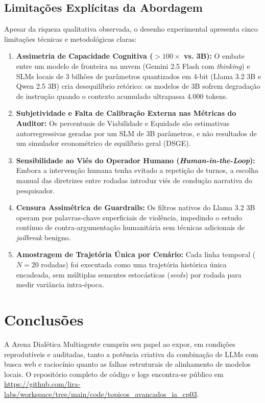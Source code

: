 \documentclass[runningheads]{llncs}
\begin{document}
\subsection{Limitações Explícitas da Abordagem}
Apesar da riqueza qualitativa observada, o desenho experimental apresenta cinco limitações técnicas e metodológicas claras:
\begin{enumerate}
    \item \textbf{Assimetria de Capacidade Cognitiva ($>100\times$ vs. 3B):} O embate entre um modelo de fronteira na nuvem (Gemini 2.5 Flash com \textit{thinking}) e SLMs locais de 3 bilhões de parâmetros quantizados em 4-bit (Llama 3.2 3B e Qwen 2.5 3B) cria desequilíbrio retórico: os modelos de 3B sofrem degradação de instrução quando o contexto acumulado ultrapassa $4.000$ tokens.
    \item \textbf{Subjetividade e Falta de Calibração Externa nas Métricas do Auditor:} Os percentuais de Viabilidade e Equidade são estimativas autorregressivas geradas por um SLM de 3B parâmetros, e não resultados de um simulador econométrico de equilíbrio geral (DSGE).
    \item \textbf{Sensibilidade ao Viés do Operador Humano (\textit{Human-in-the-Loop}):} Embora a intervenção humana tenha evitado a repetição de turnos, a escolha manual das diretrizes entre rodadas introduz viés de condução narrativa do pesquisador.
    \item \textbf{Censura Assimétrica de Guardrails:} Os filtros nativos do Llama 3.2 3B operam por palavras-chave superficiais de violência, impedindo o estudo contínuo de contra-argumentação humanitária sem técnicas adicionais de \textit{jailbreak} benigno.
    \item \textbf{Amostragem de Trajetória Única por Cenário:} Cada linha temporal ($N=20$ rodadas) foi executada como uma trajetória histórica única encadeada, sem múltiplas sementes estocásticas (\textit{seeds}) por rodada para medir variância intra-época.
\end{enumerate}

\section{Conclusões}
A Arena Dialética Multiagente cumpriu seu papel ao expor, em condições reprodutíveis e auditadas, tanto a potência criativa da combinação de LLMs com busca web e raciocínio quanto as falhas estruturais de alinhamento de modelos locais. O repositório completo de código e logs encontra-se público em \url{https://github.com/lira-labs/workspace/tree/main/code/topicos_avancados_ia_cp03}.
\end{document}
